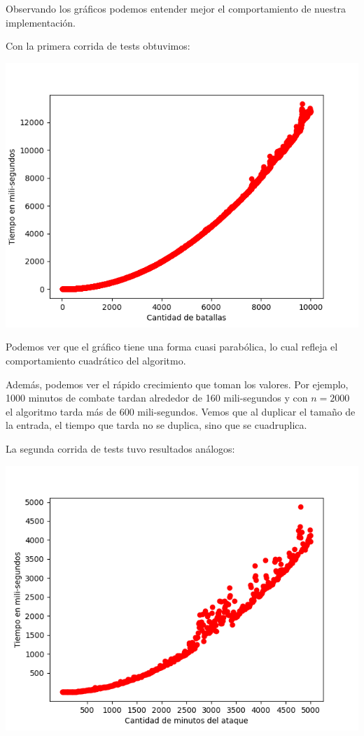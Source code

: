 \documentclass{article}
\begin{document}
Observando los gráficos podemos entender mejor el comportamiento de nuestra implementación. 

Con la primera corrida de tests obtuvimos:

\includegraphics[scale=0.69]{graficoComplejidadVintage.png}

Podemos ver que el gráfico tiene una forma cuasi parabólica, lo cual refleja el comportamiento cuadrático del algoritmo.

Además, podemos ver el rápido crecimiento que toman los valores. Por ejemplo, 1000 minutos de combate tardan alrededor de 160 mili-segundos y con $n = 2000$ el algoritmo tarda más de 600 mili-segundos. Vemos que al duplicar el tamaño de la entrada, el tiempo que tarda no se duplica, sino que se cuadruplica.

La segunda corrida de tests tuvo resultados análogos:

\includegraphics[scale=0.69]{graficoComplejidad.png}
\end{document}
